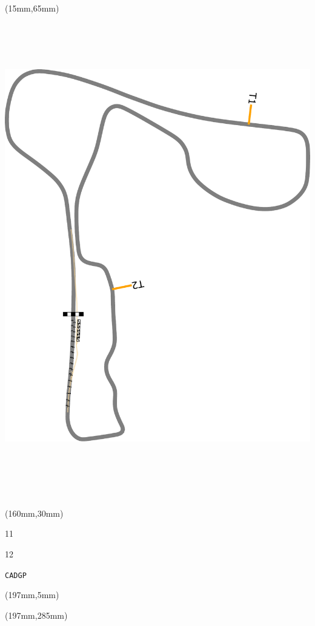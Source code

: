 \begin{textblock*}{185mm}(15mm,65mm)%
\centering
\mbox{\includegraphics[width=185mm,height=210mm,keepaspectratio]{PT/CADGP.pdf}}
\end{textblock*}
\begin{textblock*}{40mm}(160mm,30mm)%
\Large
\par{} 
\par11 
\par12 
\par\hfill\tiny\tt CADGP\\
\end{textblock*}
\begin{textblock*}{20mm}(197mm,5mm)%
\fbox{\thepage}
\label{CADGP}
\end{textblock*}
\begin{textblock*}{20mm}(197mm,285mm)%
\fbox{\thepage}
\end{textblock*}

